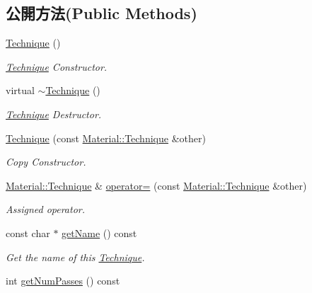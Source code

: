 \subsection*{公開方法(Public Methods)}
\begin{DoxyCompactItemize}
\item 
\hyperlink{class_i_dream_sky_1_1_material_1_1_technique_a5c376b57ddf4afd862e409c6ee21235b}{Technique} ()
\begin{DoxyCompactList}\small\item\em \hyperlink{class_i_dream_sky_1_1_material_1_1_technique}{Technique} Constructor. \end{DoxyCompactList}\item 
virtual \hyperlink{class_i_dream_sky_1_1_material_1_1_technique_aac4f42459281e674556d5ada7df96a15}{$\sim$\+Technique} ()
\begin{DoxyCompactList}\small\item\em \hyperlink{class_i_dream_sky_1_1_material_1_1_technique}{Technique} Destructor. \end{DoxyCompactList}\item 
\hyperlink{class_i_dream_sky_1_1_material_1_1_technique_ac20b220f353315874aab2e39de7871b5}{Technique} (const \hyperlink{class_i_dream_sky_1_1_material_1_1_technique}{Material\+::\+Technique} \&other)
\begin{DoxyCompactList}\small\item\em Copy Constructor. \end{DoxyCompactList}\item 
\hyperlink{class_i_dream_sky_1_1_material_1_1_technique}{Material\+::\+Technique} \& \hyperlink{class_i_dream_sky_1_1_material_1_1_technique_a7441f54066a1acfdfdf5b4ba1c8fe06d}{operator=} (const \hyperlink{class_i_dream_sky_1_1_material_1_1_technique}{Material\+::\+Technique} \&other)
\begin{DoxyCompactList}\small\item\em Assigned operator. \end{DoxyCompactList}\item 
const char $\ast$ \hyperlink{class_i_dream_sky_1_1_material_1_1_technique_a79eea9e5f8d8a95120441a522a6b64df}{get\+Name} () const 
\begin{DoxyCompactList}\small\item\em Get the name of this \hyperlink{class_i_dream_sky_1_1_material_1_1_technique}{Technique}. \end{DoxyCompactList}\item 
int \hyperlink{class_i_dream_sky_1_1_material_1_1_technique_a6d2d42e9b76fcf40dd7fd0ac26955d40}{get\+Num\+Passes} () const 

\end{DoxyCompactItemize}
